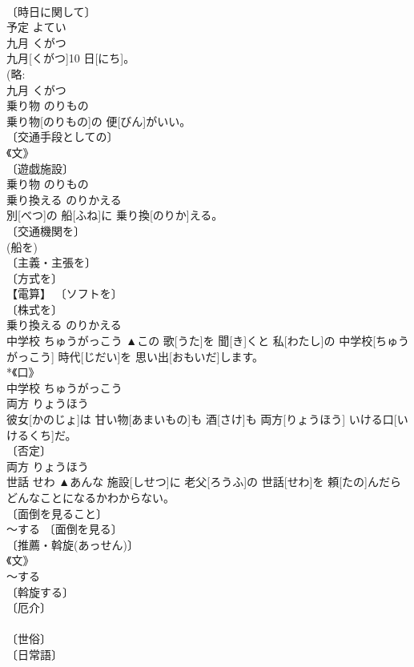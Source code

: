 \documentclass[8pt]{extreport}
\begin{document}
\begin{CJK}{UTF8}{min}
\\	〔時日に関して〕 
\\	予定	よてい	
\\	九月	くがつ	
\\	九月[くがつ]10 日[にち]。	
\\	(略: 
\\	九月	くがつ	
\\	乗り物	のりもの	
\\	乗り物[のりもの]の 便[びん]がいい。	
\\	〔交通手段としての〕 
\\	《文》 
\\	〔遊戯施設〕 
\\	乗り物	のりもの	
\\	乗り換える	のりかえる	
\\	別[べつ]の 船[ふね]に 乗り換[のりか]える。	
\\	〔交通機関を〕 
\\	(船を) 
\\	〔主義・主張を〕 
\\	〔方式を〕 
\\	【電算】 〔ソフトを〕 
\\	〔株式を〕 
\\	乗り換える	のりかえる	
\\	中学校	ちゅうがっこう	▲この 歌[うた]を 聞[き]くと 私[わたし]の 中学校[ちゅうがっこう] 時代[じだい]を 思い出[おもいだ]します。	
\\	*《口》 
\\	[⇒ちゅうがく]	中学校	ちゅうがっこう	
\\	両方	りょうほう	
\\	彼女[かのじょ]は 甘い物[あまいもの]も 酒[さけ]も 両方[りょうほう] いける口[いけるくち]だ。	
\\	〔否定〕 
\\	両方	りょうほう	
\\	世話	せわ	▲あんな 施設[しせつ]に 老父[ろうふ]の 世話[せわ]を 頼[たの]んだらどんなことになるかわからない。	
\\	〔面倒を見ること〕 
\\	～する 〔面倒を見る〕 
\\	〔推薦・斡旋(あっせん)〕 
\\	《文》 
\\	～する 
\\	〔斡旋する〕 
\\	〔厄介〕 
\\	[⇒おせわ] 
\\	〔世俗〕 
\\	〔日常語〕 

\end{CJK}
\end{document}
